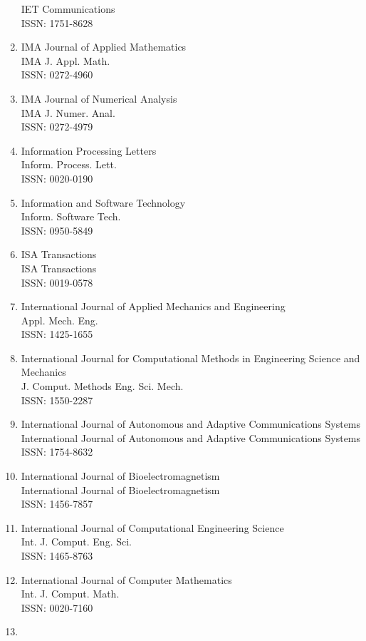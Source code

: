 \begin{enumerate}
 IET Communications\\
 ISSN: 1751-8628
\item
 IMA Journal of Applied Mathematics\\
 IMA J. Appl. Math.\\
 ISSN: 0272-4960
\item
 IMA Journal of Numerical Analysis\\
 IMA J. Numer. Anal.\\
 ISSN: 0272-4979
\item
 Information Processing Letters\\
 Inform. Process. Lett.\\
 ISSN: 0020-0190
\item
 Information and Software Technology\\
 Inform. Software Tech.\\
 ISSN: 0950-5849
\item
 ISA Transactions\\
 ISA Transactions\\
 ISSN: 0019-0578
\item
 International Journal of Applied Mechanics and Engineering\\
 Appl. Mech. Eng.\\
 ISSN: 1425-1655
\item
 International Journal for Computational Methods in Engineering Science and Mechanics\\
 J. Comput. Methods Eng. Sci. Mech.\\
 ISSN: 1550-2287
\item
 International Journal of Autonomous and Adaptive Communications Systems\\
 International Journal of Autonomous and Adaptive Communications Systems\\
 ISSN: 1754-8632
\item
 International Journal of Bioelectromagnetism\\
 International Journal of Bioelectromagnetism\\
 ISSN: 1456-7857
\item
 International Journal of Computational Engineering Science\\
 Int. J. Comput. Eng. Sci.\\
 ISSN: 1465-8763
\item
 International Journal of Computer Mathematics\\
 Int. J. Comput. Math.\\
 ISSN: 0020-7160
\item

\end{enumerate}

